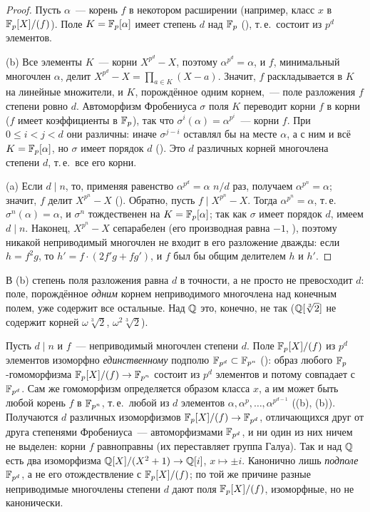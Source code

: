 \begin{proof}
Пусть $\alpha$~--- корень $f$ в некотором расширении (например, класс $x$ в $\mathbb F_p[X]/(f)$). Поле $K=\mathbb F_p[\alpha]$ имеет
степень $d$ над $\mathbb F_p$ (), т.\,е.\ состоит из $p^d$ элементов.

(b) Все элементы $K$~--- корни $X^{p^d}-X$, поэтому $\alpha^{p^d}=\alpha$, и $f$, минимальный многочлен $\alpha$, делит
$X^{p^d}-X=\prod_{a\in K}(X-a)$. Значит, $f$ раскладывается в $K$ на линейные множители, и $K$, порождённое одним корнем,~---
поле разложения $f$ степени ровно $d$. Автоморфизм Фробениуса $\sigma$ поля $K$ переводит корни $f$ в корни ($f$ имеет
коэффициенты в $\mathbb F_p$), так что $\sigma^i(\alpha)=\alpha^{p^i}$~--- корни $f$. При $0\le i<j<d$ они различны: иначе $\sigma^{j-i}$
оставлял бы на месте $\alpha$, а с ним и всё $K=\mathbb F_p[\alpha]$, но $\sigma$ имеет порядок $d$ (). Это $d$ различных
корней многочлена степени $d$, т.\,е.\ все его корни.

(a) Если $d\mid n$, то, применяя равенство $\alpha^{p^d}=\alpha$ $n/d$ раз, получаем $\alpha^{p^n}=\alpha$; значит, $f$ делит
$X^{p^n}-X$ (). Обратно, пусть $f\mid X^{p^n}-X$. Тогда $\alpha^{p^n}=\alpha$, т.\,е.\ $\sigma^n(\alpha)=\alpha$, и $\sigma^n$
тождественен на $K=\mathbb F_p[\alpha]$; так как $\sigma$ имеет порядок $d$, имеем $d\mid n$. Наконец, $X^{p^n}-X$ сепарабелен (его
производная равна $-1$, ), поэтому никакой неприводимый многочлен не входит в его разложение дважды: если
$h=f^2g$, то $h'=f\cdot(2f'g+fg')$, и $f$ был бы общим делителем $h$ и $h'$.
\end{proof}

В (b) степень поля разложения равна $d$ в точности, а не просто не превосходит $d$: поле, порождённое \emph{одним}
корнем неприводимого многочлена над конечным полем, уже содержит все остальные. Над $\mathbb Q$ это, конечно, не так
($\mathbb Q[\sqrt[3]2]$ не содержит корней $\omega\sqrt[3]2$, $\omega^2\sqrt[3]2$).

\begin{aside}
Пусть $d\mid n$ и $f$~--- неприводимый многочлен степени $d$. Поле $\mathbb F_p[X]/(f)$ из $p^d$ элементов изоморфно
\emph{единственному} подполю $\mathbb F_{p^d}\subset\mathbb F_{p^n}$ (): образ любого $\mathbb F_p$-гомоморфизма $\mathbb F_p[X]/(f)\to\mathbb F_{p^n}$
состоит из $p^d$ элементов и потому совпадает с $\mathbb F_{p^d}$. Сам же гомоморфизм определяется образом класса $x$, а им
может быть любой корень $f$ в $\mathbb F_{p^n}$, т.\,е.\ любой из $d$ элементов $\alpha,\alpha^p,\dots,\alpha^{p^{d-1}}$ ((b), (b)). Получаются
$d$ различных изоморфизмов $\mathbb F_p[X]/(f)\to\mathbb F_{p^d}$, отличающихся друг от друга степенями Фробениуса~--- автоморфизмами
$\mathbb F_{p^d}$, и ни один из них ничем не выделен: корни $f$ равноправны (их переставляет группа Галуа). Так и над $\mathbb Q$
есть два изоморфизма $\mathbb Q[X]/(X^2+1)\to\mathbb Q[i]$, $x\mapsto\pm i$. Канонично лишь \emph{подполе} $\mathbb F_{p^d}$, а не его
отождествление с $\mathbb F_p[X]/(f)$; по той же причине разные неприводимые многочлены степени $d$ дают поля $\mathbb F_p[X]/(f)$,
изоморфные, но не канонически.
\end{aside}


